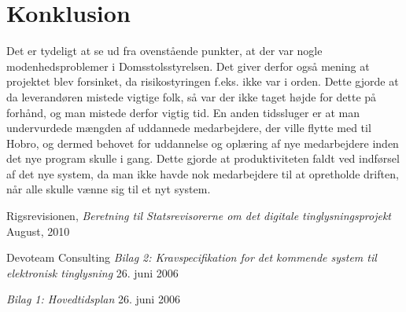 \documentclass[10pt,a4paper,danish]{article}
\begin{document}
\section{Konklusion}
Det er tydeligt at se ud fra ovenstående punkter, at der var nogle modenhedsproblemer i Domsstolsstyrelsen. Det giver derfor også mening at projektet blev forsinket, da risikostyringen f.eks. ikke var i orden. Dette gjorde at da leverandøren mistede vigtige folk, så var der ikke taget højde for dette på forhånd, og man mistede derfor vigtig tid. En anden tidssluger er at man undervurdede mængden af uddannede medarbejdere, der ville flytte med til Hobro, og dermed behovet for uddannelse og oplæring af nye medarbejdere inden det nye program skulle i gang. Dette gjorde at produktiviteten faldt ved indførsel af det nye system, da man ikke havde nok medarbejdere til at opretholde driften, når alle skulle vænne sig til et nyt system.


\begin{thebibliography}{9}

  Rigsrevisionen,
  \emph{Beretning til Statsrevisorerne om det digitale   
  tinglysningsprojekt}
  August, 2010

  Devoteam Consulting
  \emph{Bilag 2: Kravspecifikation for det kommende
  system til elektronisk tinglysning}
  26. juni 2006

  \emph{Bilag 1: Hovedtidsplan}
  26. juni 2006

\end{thebibliography}
\end{document}
